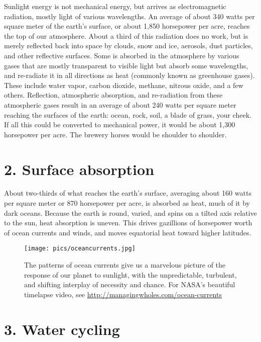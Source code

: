 \documentclass[11pt,letterpaper,twoside,onecolumn]{memoir}
\begin{document}
Sunlight energy is not mechanical energy, but arrives as electromagnetic radiation, mostly light of various wavelengths. An average of about 340 watts per square meter of the earth's surface, or about 1,850 horsepower per acre, reaches the top of our atmosphere. About a third of this radiation does no work, but is merely reflected back into space by clouds, snow and ice, aerosols, dust particles, and other reflective surfaces. Some is absorbed in the atmosphere by various gases that are mostly transparent to visible light but absorb some wavelengths, and re-radiate it in all directions as heat (commonly known as greenhouse gases). These include water vapor, carbon dioxide, methane, nitrous oxide, and a few others. Reflection, atmospheric absorption, and re-radiation from these atmospheric gases result in an average of about 240 watts per square meter reaching the surfaces of the earth: ocean, rock, soil, a blade of grass, your cheek. If all this could be converted to mechanical power, it would be about 1,300 horsepower per acre. The brewery horses would be shoulder to shoulder.


\section*{2. Surface absorption}

About two-thirds of what reaches the earth's surface, averaging about 160 watts per square meter or 870 horsepower per acre, is absorbed as heat, much of it by dark oceans. Because the earth is round, varied, and spins on a tilted axis relative to the sun, heat absorption is uneven. This drives gazillions of horsepower worth of ocean currents and winds, and moves equatorial heat toward higher latitudes.

\begin{figure}[h]
\centering
\begin{minipage}{.80\textwidth}
\texttt{[image: pics/oceancurrents.jpg]}
\caption*{The patterns of ocean currents give us a marvelous picture of the response of our planet to sunlight, with the unpredictable, turbulent, and shifting interplay of necessity and chance. For NASA's beautiful timelapse video, see \url{http://managingwholes.com/ocean-currents}}
\end{minipage}
\end{figure}


\section*{3. Water cycling}
\end{document}
